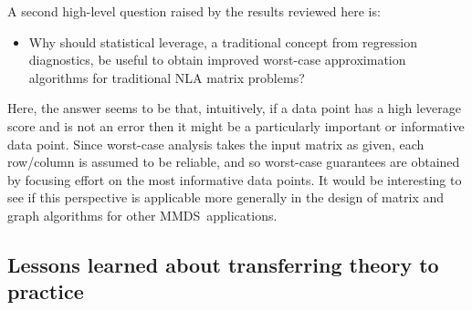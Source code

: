 \documentclass[twoside]{article}
\begin{document}
A second high-level question raised by the results reviewed here is: 
\begin{itemize}
\item
Why should statistical leverage, a traditional concept 
from regression diagnostics, be useful to obtain improved worst-case 
approximation algorithms for traditional NLA matrix problems?
\end{itemize}
Here, the answer seems to be that, 
intuitively, if a data point has a high 
leverage score and is not an error then it might be a particularly 
important or informative data point.  
Since worst-case analysis takes the input matrix as given, each row/column 
is assumed to be reliable, and so worst-case guarantees are obtained by 
focusing effort on the most informative data points.
It would be interesting to see if this perspective is applicable more 
generally in the design of matrix and graph algorithms for other 
MMDS~applications.

\subsection{Lessons learned about transferring theory to practice}
\end{document}
